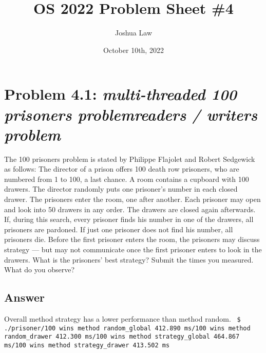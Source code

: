 \documentclass[
	12pt, %
]{fphw}
\title{OS 2022 Problem Sheet \#4} %
\author{Joshua Law} %
\date{October 10th, 2022} %
\institute{Jacobs University Bremen \\ Bachelor Of Computer Science} %
\begin{document}
\maketitle %


\section*{Problem 4.1: \emph{multi-threaded 100 prisoners problemreaders / writers problem}}

\begin{problem}The 100 prisoners problem is stated by Philippe Flajolet and Robert Sedgewick as follows:
\newline
The director of a prison offers 100 death row prisoners, who are numbered from 1 to 100, a last chance. A room contains a cupboard with 100 drawers. The director randomly puts one prisoner’s number in each closed drawer. The prisoners enter the room, one after another. Each prisoner may open and look into 50 drawers in any order. The drawers are closed again afterwards. If, during this search, every prisoner finds his number in one of the drawers, all prisoners are pardoned. If just one prisoner does not find his number, all prisoners die. Before the first prisoner enters the room, the prisoners may discuss strategy — but may not communicate once the first prisoner enters to look in the drawers. What is the prisoners’ best strategy?
\newline
Submit the times you measured. What do you observe?
\end{problem}

\subsection*{Answer}
Overall method strategy has a lower performance than method random.
\texttt{\newline
\$ ./prisoner/100 wins method random\_global 412.890 ms/100 wins method random\_drawer 412.300 ms/100 wins method strategy\_global 464.867 ms/100 wins method strategy\_drawer 413.502 ms\newline
}



\end{document}
